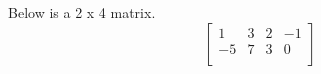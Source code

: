 \begin{example}
	Below is a 2 x 4 matrix.
	\begin{equation*}
		\begin{bmatrix}
			1 & 3 & 2 & -1 \\
			-5 & 7 & 3 & 0 \\
		\end{bmatrix}
	\end{equation*}
\end{example}